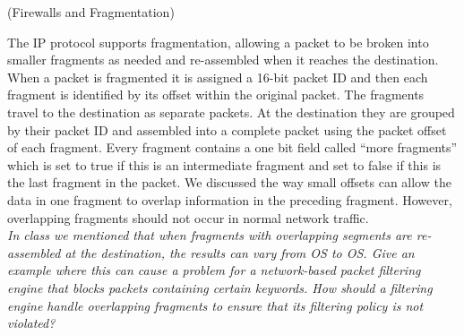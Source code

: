 \begin{prob}  (Firewalls and Fragmentation)
\end{prob}

\noindent The IP protocol supports fragmentation, allowing a packet to be broken into smaller fragments as needed and re-assembled when it reaches the destination. When a packet is fragmented it is assigned a 16-bit packet ID and then each fragment is identified by its offset within the original packet. The fragments travel to the destination as separate packets. At the destination they are grouped by their packet ID and assembled into a complete packet using the packet offset of each fragment. Every fragment contains a one bit field called ``more fragments'' which is set to true if this is an intermediate fragment and set to false if this is the last fragment in the packet. We discussed the way small offsets can allow the data in one fragment to overlap information in the preceding fragment. However, overlapping fragments should not occur in normal network traffic.\\

\textit{In class we mentioned that when fragments with overlapping segments are re-assembled at the destination, the results can vary from OS to OS. Give an example where this can cause a problem for a network-based packet filtering engine that blocks packets containing certain keywords. How should a filtering engine handle overlapping fragments to ensure that its filtering policy is not violated?}